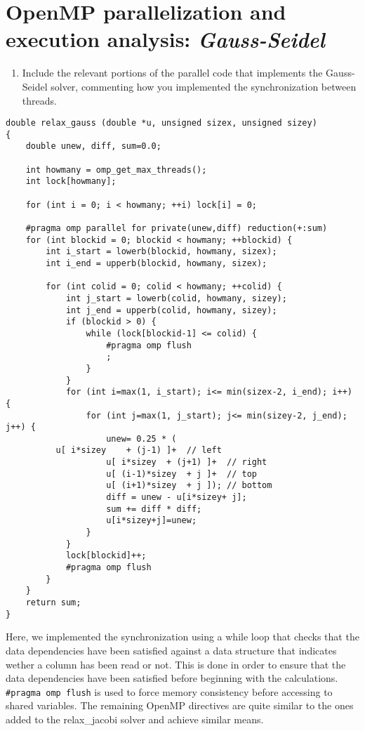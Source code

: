 \documentclass{report}
\begin{document}
\chapter{OpenMP parallelization and execution analysis: \textit{Gauss-Seidel}}

\begin{enumerate}
  \item Include the relevant portions of the parallel code that implements the Gauss-Seidel solver, commenting how you implemented the synchronization between threads.
\end{enumerate}

\begin{lstlisting}[style=C2]
double relax_gauss (double *u, unsigned sizex, unsigned sizey)
{
	double unew, diff, sum=0.0;

	int howmany = omp_get_max_threads();
	int lock[howmany];

	for (int i = 0; i < howmany; ++i) lock[i] = 0;

	#pragma omp parallel for private(unew,diff) reduction(+:sum)
	for (int blockid = 0; blockid < howmany; ++blockid) {
		int i_start = lowerb(blockid, howmany, sizex);
		int i_end = upperb(blockid, howmany, sizex);

		for (int colid = 0; colid < howmany; ++colid) {
			int j_start = lowerb(colid, howmany, sizey);
			int j_end = upperb(colid, howmany, sizey);
			if (blockid > 0) {
				while (lock[blockid-1] <= colid) {
					#pragma omp flush
					;
				}
			}
			for (int i=max(1, i_start); i<= min(sizex-2, i_end); i++) {
				for (int j=max(1, j_start); j<= min(sizey-2, j_end); j++) {
					unew= 0.25 * (
          u[ i*sizey	+ (j-1) ]+  // left
					u[ i*sizey	+ (j+1) ]+  // right
					u[ (i-1)*sizey	+ j ]+  // top
					u[ (i+1)*sizey	+ j ]); // bottom
					diff = unew - u[i*sizey+ j];
					sum += diff * diff;
					u[i*sizey+j]=unew;
				}
			}
			lock[blockid]++;
			#pragma omp flush
		}
	}
	return sum;
}
\end{lstlisting}

\vspace{1cm}

Here, we implemented the synchronization using a while loop that checks that the data dependencies have been satisfied against a data structure that indicates wether a column has been read or not. This is done in order to ensure that the data dependencies have been satisfied before beginning with the calculations. \texttt{\#pragma omp flush} is used to force memory consistency before accessing to shared variables. The remaining OpenMP directives are quite similar to the ones added to the relax\_jacobi solver and achieve similar means.
\end{document}
